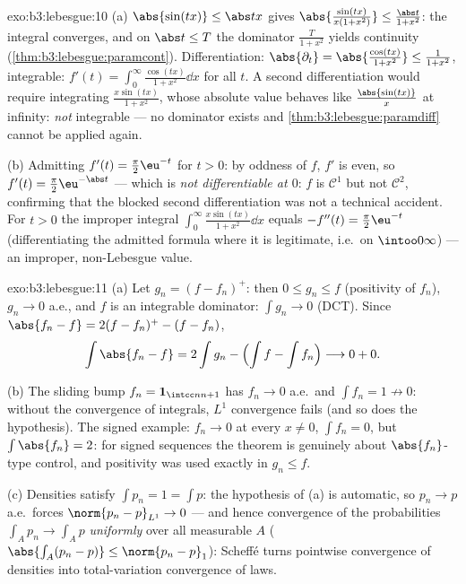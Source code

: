 \begin{solution}{exo:b3:lebesgue:10}
(a) $\abs{\sin(tx)} \leq \abs tx$ gives
$\abs{\frac{\sin(tx)}{x(1+x^2)}} \leq \frac{\abs
t}{1+x^2}$: the integral converges, and on $\abs t \leq T$ the
dominator $\frac{T}{1+x^2}$ yields continuity
(\cref{thm:b3:lebesgue:paramcont}). Differentiation:
$\abs{\partial_t} = \abs{\frac{\cos(tx)}{1+x^2}} \leq
\frac1{1+x^2}$, integrable: $f'(t) =
\int_0^\infty\frac{\cos(tx)}{1+x^2}\dd x$ for all $t$. A second
differentiation would require integrating $\frac{x\sin(tx)}{1 +
x^2}$, whose absolute value behaves like $\frac{\abs{\sin(tx)}}
x$ at infinity: \emph{not} integrable --- no dominator exists
and \cref{thm:b3:lebesgue:paramdiff} cannot be applied again.

(b) Admitting $f'(t) = \frac\pi2\eu^{-t}$ for $t > 0$: by
oddness of $f$, $f'$ is even, so $f'(t) =
\frac\pi2\eu^{-\abs t}$ --- which is \emph{not differentiable
at $0$}: $f$ is $\mathcal C^1$ but not $\mathcal C^2$,
confirming that the blocked second differentiation was not a
technical accident. For $t > 0$ the improper integral
$\int_0^\infty\frac{x\sin(tx)}{1+x^2}\dd x$ equals $-f''(t) =
\frac\pi2\eu^{-t}$ (differentiating the admitted formula where
it is legitimate, i.e.\ on $\intoo0\infty$) --- an improper,
non-Lebesgue value.
\end{solution}

\begin{solution}{exo:b3:lebesgue:11}
(a) Let $g_n = (f - f_n)^+$: then $0 \leq g_n \leq f$
(positivity of $f_n$), $g_n \to 0$ a.e., and $f$ is an
integrable dominator: $\int g_n \to 0$ (DCT). Since
$\abs{f_n - f} = 2(f - f_n)^+ - (f - f_n)$,
\[
\int\abs{f_n - f} = 2\int g_n - \Bigl(\int f - \int
f_n\Bigr) \longrightarrow 0 + 0 .
\]

(b) The sliding bump $f_n = \mathbf 1_{\intcc n{n+1}}$ has
$f_n \to 0$ a.e.\ and $\int f_n = 1 \not\to 0$: without the
convergence of integrals, $L^1$ convergence fails (and so
does the hypothesis). The signed example: $f_n \to 0$ at
every $x \neq 0$, $\int f_n = 0$, but $\int\abs{f_n} = 2$:
for signed sequences the theorem is genuinely about
$\abs{f_n}$-type control, and positivity was used exactly in
$g_n \leq f$.

(c) Densities satisfy $\int p_n = 1 = \int p$: the
hypothesis of (a) is automatic, so $p_n \to p$ a.e.\ forces
$\norm{p_n - p}_{L^1} \to 0$ --- and hence convergence of
the probabilities $\int_Ap_n \to \int_Ap$ \emph{uniformly}
over all measurable $A$ ($\abs{\int_A(p_n - p)} \leq
\norm{p_n - p}_1$): Scheff\'e turns pointwise convergence of
densities into total-variation convergence of laws.
\end{solution}

